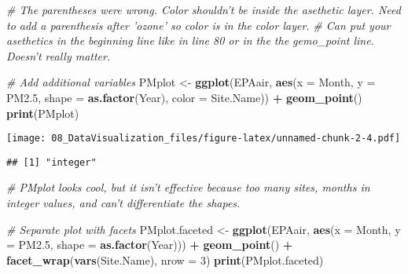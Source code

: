\documentclass[]{article}
\newenvironment{Shaded}{\begin{snugshade}}{\end{snugshade}}
\newcommand{\KeywordTok}[1]{\textcolor[rgb]{0.13,0.29,0.53}{\textbf{#1}}}
\newcommand{\DataTypeTok}[1]{\textcolor[rgb]{0.13,0.29,0.53}{#1}}
\newcommand{\DecValTok}[1]{\textcolor[rgb]{0.00,0.00,0.81}{#1}}
\newcommand{\StringTok}[1]{\textcolor[rgb]{0.31,0.60,0.02}{#1}}
\newcommand{\CommentTok}[1]{\textcolor[rgb]{0.56,0.35,0.01}{\textit{#1}}}
\newcommand{\OperatorTok}[1]{\textcolor[rgb]{0.81,0.36,0.00}{\textbf{#1}}}
\newcommand{\NormalTok}[1]{#1}
\begin{document}
\begin{Shaded}
\begin{Highlighting}[]
\CommentTok{# The parentheses were wrong. Color shouldn't be inside the asethetic layer. Need to add a parenthesis after 'ozone' so color is in the color layer. }
\CommentTok{# Can put your asethetics in the beginning line like in line 80 or in the the gemo_point line. Doesn't really matter.}

\CommentTok{# Add additional variables}
\NormalTok{PMplot <-}\StringTok{ }
\StringTok{  }\KeywordTok{ggplot}\NormalTok{(EPAair, }\KeywordTok{aes}\NormalTok{(}\DataTypeTok{x =}\NormalTok{ Month, }\DataTypeTok{y =}\NormalTok{ PM2.}\DecValTok{5}\NormalTok{, }\DataTypeTok{shape =} \KeywordTok{as.factor}\NormalTok{(Year), }
                     \DataTypeTok{color =}\NormalTok{ Site.Name)) }\OperatorTok{+}
\StringTok{  }\KeywordTok{geom_point}\NormalTok{()}
\KeywordTok{print}\NormalTok{(PMplot)}
\end{Highlighting}
\end{Shaded}

\texttt{[image: 08\_DataVisualization\_files/figure-latex/unnamed-chunk-2-4.pdf]}

\begin{Shaded}
\end{Shaded}

\begin{verbatim}
## [1] "integer"
\end{verbatim}

\begin{Shaded}
\begin{Highlighting}[]
\CommentTok{# PMplot looks cool, but it isn't effective because too many sites, months in integer values, and can't differentiate the shapes.}


\CommentTok{# Separate plot with facets}
\NormalTok{PMplot.faceted <-}
\StringTok{  }\KeywordTok{ggplot}\NormalTok{(EPAair, }\KeywordTok{aes}\NormalTok{(}\DataTypeTok{x =}\NormalTok{ Month, }\DataTypeTok{y =}\NormalTok{ PM2.}\DecValTok{5}\NormalTok{, }\DataTypeTok{shape =} \KeywordTok{as.factor}\NormalTok{(Year))) }\OperatorTok{+}
\StringTok{  }\KeywordTok{geom_point}\NormalTok{() }\OperatorTok{+}
\StringTok{  }\KeywordTok{facet_wrap}\NormalTok{(}\KeywordTok{vars}\NormalTok{(Site.Name), }\DataTypeTok{nrow =} \DecValTok{3}\NormalTok{)}
\KeywordTok{print}\NormalTok{(PMplot.faceted)}
\end{Highlighting}
\end{Shaded}
\end{document}
